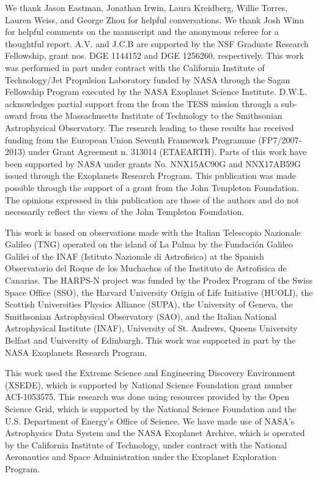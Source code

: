 \documentclass{emulateapj}
\begin{document}
\acknowledgments
We thank Jason Eastman, Jonathan Irwin, Laura Kreidberg, Willie Torres, Lauren Weiss, and George Zhou for helpful conversations. We thank Josh Winn for helpful comments on the manuscript and the anonymous referee for a thoughtful report. A.V. and J.C.B are supported by the NSF Graduate Research Fellowship, grant nos. DGE 1144152 and DGE 1256260, respectively. This work was performed in part under contract with the California Institute of Technology/Jet Propulsion Laboratory funded by NASA through the Sagan Fellowship Program executed by the NASA Exoplanet Science Institute. D.W.L. acknowledges partial support from the from the TESS mission through a sub-award from the Massachusetts Institute of Technology to the Smithsonian Astrophysical Observatory. The research leading to these results has received funding from the European Union Seventh Framework Programme (FP7/2007-2013) under Grant Agreement n. 313014 (ETAEARTH). Parts of this work have been supported by NASA under grants No. NNX15AC90G and NNX17AB59G issued through the Exoplanets Research Program. This publication was made possible through the support of a grant from the John Templeton Foundation. The opinions expressed in this publication are those of the authors and do not necessarily reflect the views of the John Templeton Foundation.

This work is based on observations made with the Italian Telescopio Nazionale Galileo (TNG) operated on the island of La Palma by the Fundación Galileo Galilei of the INAF (Istituto Nazionale di Astrofisica) at the Spanish Observatorio del Roque de los Muchachos of the Instituto de Astrofisica de Canarias. The HARPS-N project was funded by the Prodex Program of the Swiss Space Office (SSO), the Harvard University Origin of Life Initiative (HUOLI), the Scottish Universities Physics Alliance (SUPA), the University of Geneva, the Smithsonian Astrophysical Observatory (SAO), and the Italian National Astrophysical Institute (INAF), University of St. Andrews, Queens University Belfast and University of Edinburgh. This work was supported in part by the NASA Exoplanets Research Program. 
 
This work used the Extreme Science and Engineering Discovery Environment (XSEDE), which is supported by National Science Foundation grant number ACI-1053575. This research was done using resources provided by the Open Science Grid, which is supported by the National Science Foundation and the U.S. Department of Energy's Office of Science. We have made use of NASA's Astrophysics Data System and the NASA Exoplanet Archive, which is operated by the California Institute of Technology, under contract with the National Aeronautics and Space Administration under the Exoplanet Exploration Program. 
\end{document}
